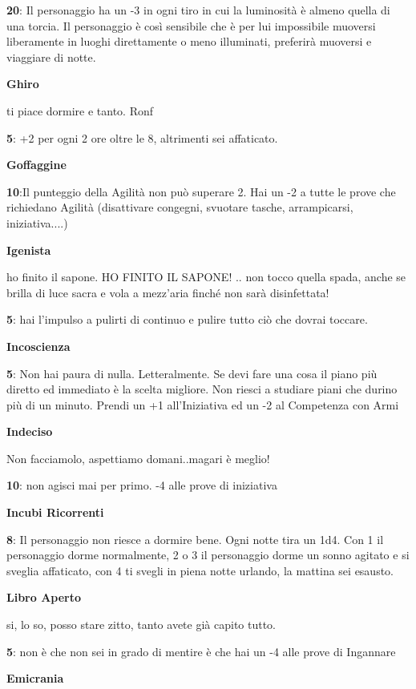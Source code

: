 \documentclass[a4paper,11pt,twoside,openany]{book}
\begin{document}
\textbf{20}: Il personaggio ha un -3 in ogni tiro in cui la luminosità è almeno quella di una torcia. Il personaggio è così sensibile che è per lui impossibile muoversi liberamente in luoghi direttamente o meno illuminati, preferirà muoversi e viaggiare di notte.

\textbf{Ghiro}

ti piace dormire e tanto. Ronf

\textbf{5}: +2 per ogni 2 ore oltre le 8, altrimenti sei affaticato.

\textbf{Goffaggine}

\textbf{10}:Il punteggio della Agilità non può superare 2. Hai un -2 a tutte le prove che richiedano Agilità (disattivare congegni, svuotare tasche, arrampicarsi, iniziativa....)

\textbf{Igenista}

ho finito il sapone. HO FINITO IL SAPONE! .. non tocco quella spada, anche se brilla di luce sacra e vola a mezz'aria finché non sarà disinfettata!

\textbf{5}: hai l'impulso a pulirti di continuo e pulire tutto ciò che dovrai toccare.

\textbf{Incoscienza}

\textbf{5}: Non hai paura di nulla. Letteralmente. Se devi fare una cosa il piano più diretto ed immediato è la scelta migliore. Non riesci a studiare piani che durino più di un minuto. Prendi un +1 all'Iniziativa ed un -2 al Competenza con Armi

\textbf{Indeciso}

Non facciamolo, aspettiamo domani..magari è meglio!

\textbf{10}: non agisci mai per primo. -4 alle prove di iniziativa

\textbf{Incubi Ricorrenti}

\textbf{8}: Il personaggio non riesce a dormire bene. Ogni notte tira un 1d4. Con 1 il personaggio dorme normalmente, 2 o 3 il personaggio dorme un sonno agitato e si sveglia affaticato, con 4 ti svegli in piena notte urlando, la mattina sei esausto.

\textbf{Libro Aperto}

si, lo so, posso stare zitto, tanto avete già capito tutto.

\textbf{5}: non è che non sei in grado di mentire è che hai un -4 alle prove di Ingannare

\textbf{Emicrania}
\end{document}
